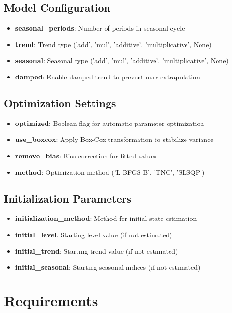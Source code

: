 \subsection{Model Configuration}
\begin{itemize}
    \item \textbf{seasonal\_periods}: Number of periods in seasonal cycle
    \item \textbf{trend}: Trend type ('add', 'mul', 'additive', 'multiplicative', None)
    \item \textbf{seasonal}: Seasonal type ('add', 'mul', 'additive', 'multiplicative', None)
    \item \textbf{damped}: Enable damped trend to prevent over-extrapolation
\end{itemize}

\subsection{Optimization Settings}
\begin{itemize}
    \item \textbf{optimized}: Boolean flag for automatic parameter optimization
    \item \textbf{use\_boxcox}: Apply Box-Cox transformation to stabilize variance
    \item \textbf{remove\_bias}: Bias correction for fitted values
    \item \textbf{method}: Optimization method ('L-BFGS-B', 'TNC', 'SLSQP')
\end{itemize}

\subsection{Initialization Parameters}
\begin{itemize}
    \item \textbf{initialization\_method}: Method for initial state estimation
    \item \textbf{initial\_level}: Starting level value (if not estimated)
    \item \textbf{initial\_trend}: Starting trend value (if not estimated)
    \item \textbf{initial\_seasonal}: Starting seasonal indices (if not estimated)
\end{itemize}

\section{Requirements}
\label{sec:requirements}

